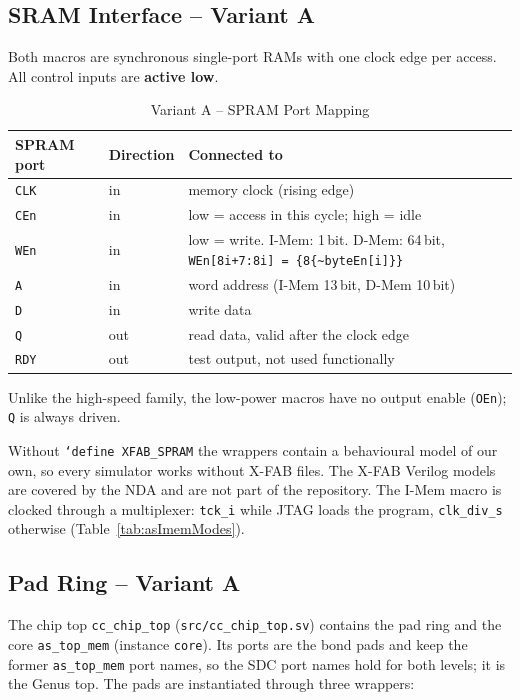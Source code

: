 \subsection{SRAM Interface -- Variant A}
\label{subsec:sramIfA}

Both macros are synchronous single-port RAMs with one clock edge per access.
All control inputs are \textbf{active low}.

\begin{table}[H]
\caption{Variant A -- SPRAM Port Mapping}
\label{tab:asSramPortsA}
\centering
\begin{tabularx}{\textwidth}{|l |l |X|}
  \hline
  SPRAM port & Direction & Connected to \\
  \hline
  \hline
  \texttt{CLK}  & in  & memory clock (rising edge) \\
  \hline
  \texttt{CEn}  & in  & low = access in this cycle; high = idle \\
  \hline
  \texttt{WEn}  & in  & low = write. I-Mem: 1\,bit. D-Mem: 64\,bit,
                        \texttt{WEn[8i+7:8i] = \{8\{\textasciitilde byteEn[i]\}\}} \\
  \hline
  \texttt{A}    & in  & word address (I-Mem 13\,bit, D-Mem 10\,bit) \\
  \hline
  \texttt{D}    & in  & write data \\
  \hline
  \texttt{Q}    & out & read data, valid after the clock edge \\
  \hline
  \texttt{RDY}  & out & test output, not used functionally \\
  \hline
\end{tabularx}
\end{table}

Unlike the high-speed family, the low-power macros have no output enable
(\texttt{OEn}); \texttt{Q} is always driven.

Without \texttt{`define XFAB\_SPRAM} the wrappers contain a behavioural
model of our own, so every simulator works without X-FAB files. The X-FAB
Verilog models are covered by the NDA and are not part of the repository.
The I-Mem macro is clocked through a multiplexer: \texttt{tck\_i} while
JTAG loads the program, \texttt{clk\_div\_s} otherwise
(Table~\ref{tab:asImemModes}).

\subsection{Pad Ring -- Variant A}
\label{subsec:padRingA}

The chip top \texttt{cc\_chip\_top} (\texttt{src/cc\_chip\_top.sv}) contains
the pad ring and the core \texttt{as\_top\_mem} (instance \texttt{core}).
Its ports are the bond pads and keep the former \texttt{as\_top\_mem} port
names, so the SDC port names hold for both levels; it is the Genus top.
The pads are instantiated through three wrappers:

